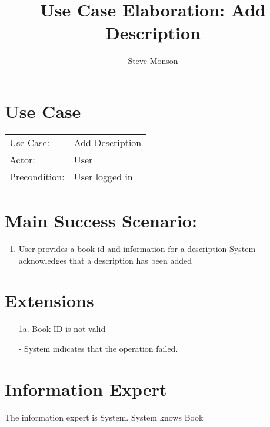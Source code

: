 \documentclass{article}
\title{Use Case Elaboration: Add Description}
\author{ Steve Monson }
\begin{document}
\maketitle


\section*{Use Case}
\begin{tabular}{l l}
Use Case:     & Add Description\\
Actor:        & User\\
Precondition: & User logged in\\
\end{tabular}


\section*{Main Success Scenario:}

\begin{enumerate}
    \item User provides a book id and information for a description
    \itme System acknowledges that a description has been added
 
\end{enumerate}

\section*{Extensions}

\begin{itemize}
    \item [1a.] Book ID is not valid
    
         - System indicates that the operation failed.
                            
\end{itemize}


\section*{Information Expert}
The information expert is System. System knows Book
\end{document}
